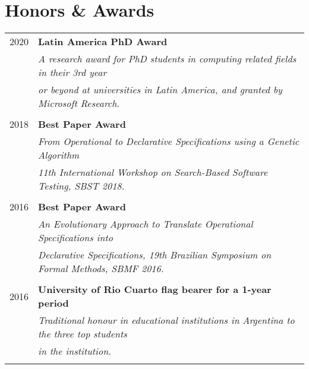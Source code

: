 \documentclass[a4paper,10pt]{article} %
\begin{document}
\section{Honors \& Awards}
\begin{longtable}{rl}

\textsc{2020} & \textbf{Latin America PhD Award} \\
& \textit{A research award for PhD students in computing related fields in their 3rd year} \\
& \textit{or beyond at universities in Latin America, and granted by Microsoft Research.} \\ & \\

\textsc{2018} & \textbf{Best Paper Award} \\ 
& \textit{From Operational to Declarative Specifications using a Genetic Algorithm} \\
& \textit{11th International Workshop on Search-Based Software Testing, SBST 2018.} \\ & \\

\textsc{2016} & \textbf{Best Paper Award} \\ 
& \textit{An Evolutionary Approach to Translate Operational Specifications into } \\
& \textit{Declarative Specifications, 19th Brazilian Symposium on Formal Methods, SBMF 2016.} \\ & \\

\textsc{2016} & \textbf{University of Rio Cuarto flag bearer for a 1-year period} \\ 
& \textit{Traditional honour in educational institutions in Argentina to the three top students} \\ 
& \textit{in the institution.} \\ & \\
\end{longtable}
\end{document}
